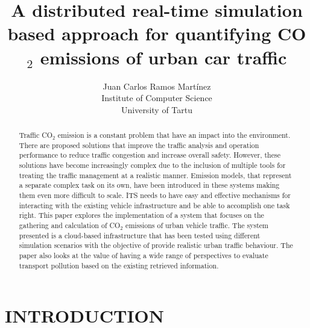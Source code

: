 \documentclass[letter, 10pt, conference]{ieeeconf}
\title{\LARGE \bf A distributed real-time simulation based approach for quantifying CO$_2$ emissions of urban car traffic}
\author{ \parbox{4 in}{ \centering Juan Carlos Ramos Martínez \\
  Institute of Computer Science\\
  University of Tartu}}
\begin{document}
\maketitle
\thispagestyle{empty}
\pagestyle{empty}


\begin{abstract}

Traffic CO$_2$ emission is a constant problem that have an impact into the environment.
There are proposed solutions that improve the traffic analysis and operation performance to reduce traffic congestion and increase overall safety.
However, these solutions have become increasingly complex due to the inclusion of multiple tools for treating the traffic management at a realistic manner.
Emission models, that represent a separate complex task on its own, have been introduced in these systems making them even more difficult to scale.
ITS needs to have easy and effective mechanisms for interacting with the existing vehicle infrastructure and be able to accomplish one task right.
This paper explores the implementation of a system that focuses on the gathering and calculation of CO$_2$ emissions of urban vehicle traffic.
The system presented is a cloud-based infrastructure that has been tested using different simulation scenarios with the objective of provide realistic urban traffic behaviour.
The paper also looks at the value of having a wide range of perspectives to evaluate transport pollution based on the existing retrieved information.

\end{abstract}

\section{INTRODUCTION}
\end{document}
